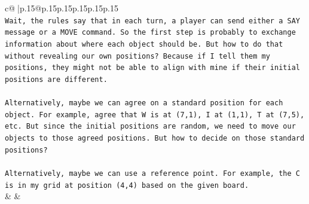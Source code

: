 \documentclass{article}
\begin{document}
{\begin{supertabular}{c@{$\;$}|p{.15\linewidth}@{}p{.15\linewidth}p{.15\linewidth}p{.15\linewidth}p{.15\linewidth}p{.15\linewidth}}
{{{\\ 
\texttt{Wait, the rules say that in each turn, a player can send either a SAY message or a MOVE command. So the first step is probably to exchange information about where each object should be. But how to do that without revealing our own positions? Because if I tell them my positions, they might not be able to align with mine if their initial positions are different.} \\
\\ 
\texttt{Alternatively, maybe we can agree on a standard position for each object. For example, agree that W is at (7,1), I at (1,1), T at (7,5), etc. But since the initial positions are random, we need to move our objects to those agreed positions. But how to decide on those standard positions?} \\
\\ 
\texttt{Alternatively, maybe we can use a reference point. For example, the C is in my grid at position (4,4) based on the given board.} \\
            }
        }
    }
    & & \\ \\


\end{supertabular}}
\end{document}
